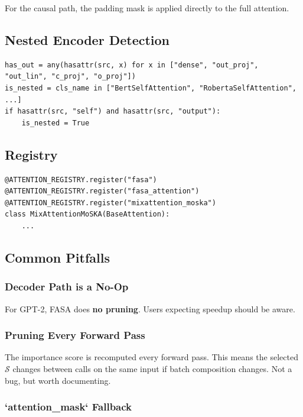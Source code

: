 For the causal path, the padding mask is applied directly to the full 
attention.

\subsection{Nested Encoder Detection}

\begin{lstlisting}
has_out = any(hasattr(src, x) for x in ["dense", "out_proj", "out_lin", "c_proj", "o_proj"])
is_nested = cls_name in ["BertSelfAttention", "RobertaSelfAttention", ...]
if hasattr(src, "self") and hasattr(src, "output"):
    is_nested = True
\end{lstlisting}

\subsection{Registry}

\begin{lstlisting}
@ATTENTION_REGISTRY.register("fasa")
@ATTENTION_REGISTRY.register("fasa_attention")
@ATTENTION_REGISTRY.register("mixattention_moska")
class MixAttentionMoSKA(BaseAttention):
    ...
\end{lstlisting}

\subsection{Common Pitfalls}

\subsubsection{Decoder Path is a No-Op}

For GPT-2, FASA does \textbf{no pruning}. Users expecting speedup should be 
aware.

\subsubsection{Pruning Every Forward Pass}

The importance score is recomputed every forward pass. This means the 
selected $\mathcal{S}$ changes between calls on the same input if batch 
composition changes. Not a bug, but worth documenting.

\subsubsection{`attention\_mask` Fallback}

